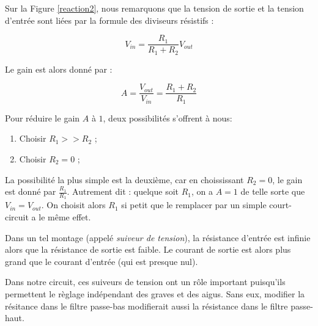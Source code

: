 Sur la Figure \ref{reaction2}, nous remarquons que la tension de sortie et la tension d'entrée sont liées 
par la formule des diviseurs résistifs :

$$V_{in} = \frac{R_1}{R_1 + R_2} V_{out}$$

Le gain est alors donné par :

$$A = \frac{V_{out}}{V_{in}} = \frac{R_1 + R_2}{R_1}$$

Pour réduire le gain $A$ à $1$, deux possibilités s'offrent à nous:

\begin{enumerate}
	\item	Choisir $R_1 >> R_2$ ;
	\item Choisir $R_2 = 0$ ;
\end{enumerate}

La possibilité la plus simple est la deuxième, car en choississant $R_2 = 0$, le gain est donné par $\frac{R_1}{R_1}$. 
Autrement dit : quelque soit $R_1$, on a $A = 1$ de telle sorte que $V_{in} = V_{out}$. On choisit alors $R_1$ si petit 
que le remplacer par un simple court-circuit a le même effet.

Dans un tel montage (appelé \textit{suiveur de tension}), la résistance d'entrée est infinie alors que la résistance de 
sortie est faible. Le courant de sortie est alors plus grand que le courant d'entrée (qui est presque nul).

Dans notre circuit, ces suiveurs de tension ont un rôle important puisqu'ils permettent le règlage indépendant des
graves et des aigus. Sans eux, modifier la résitance dans le filtre passe-bas modifierait aussi la résistance dans
le filtre passe-haut.


